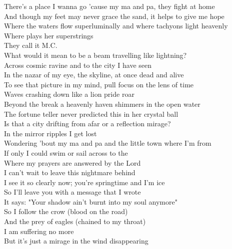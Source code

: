 



There's a place I wanna go 'cause my ma and pa, they fight at home \\
And though my feet may never grace the sand, it helps to give me hope \\
Where the waters flow superluminally and where tachyons light heavenly \\
Where  plays her superstrings \\
They call it M.C. \\

What would it mean to be a beam travelling like lightning? \\
Across cosmic ravine and to the city I have seen \\
In the nazar of my eye, the skyline, at once dead and alive \\
To see that picture in my mind, pull focus on the lens of time \\

Waves crashing down like a lion pride roar \\
Beyond the break a heavenly haven shimmers in the open water \\
The fortune teller never predicted this in her crystal ball \\
Is that a city drifting from afar or a reflection mirage? \\

In the mirror ripples I get lost \\
Wondering 'bout my ma and pa and the little town where I'm from \\
If only I could swim or sail across to the  \\
Where my prayers are answered by the Lord \\

I can't wait to leave this nightmare behind \\
I see it so clearly now; you're springtime and I'm ice \\
So I'll leave you with a message that I wrote \\
It says: "Your shadow ain't burnt into my soul anymore" \\

So I follow the crow (blood on the road) \\
And the prey of eagles (chained to my throat) \\
I am suffering no more \\
But it's just a mirage in the wind disappearing \\


